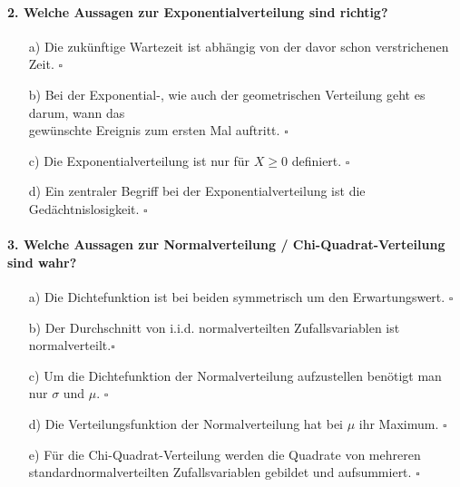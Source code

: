 \documentclass[a4paper]{article}
\begin{document}
\paragraph{2. Welche Aussagen zur Exponentialverteilung sind richtig?}
\begin{itemize}
    \item[a)] Die zukünftige Wartezeit ist abhängig von der davor schon verstrichenen Zeit. \hfill $\square$
    \item[b)] Bei der Exponential-, wie auch der geometrischen Verteilung geht es darum, wann das\\ gewünschte Ereignis zum ersten Mal auftritt. \hfill $\square$
    \item[c)] Die Exponentialverteilung ist nur für $X \geq 0$ definiert. \hfill $\square$
    \item[d)] Ein zentraler Begriff bei der Exponentialverteilung ist die Gedächtnislosigkeit. \hfill $\square$
\end{itemize}

\paragraph{3. Welche Aussagen zur Normalverteilung / Chi-Quadrat-Verteilung sind wahr?}
\begin{itemize}
    \item[a)] Die Dichtefunktion ist bei beiden symmetrisch um den Erwartungswert. \hfill $\square$
    \item[b)] Der Durchschnitt von i.i.d. normalverteilten Zufallsvariablen ist normalverteilt.\hfill $\square$ 
    \item[c)] Um die Dichtefunktion der Normalverteilung aufzustellen benötigt man nur $\sigma$ und $\mu$. \hfill $\square$
    \item[d)] Die Verteilungsfunktion der Normalverteilung hat bei $\mu$ ihr Maximum. \hfill $\square$
    \item[e)] Für die Chi-Quadrat-Verteilung werden die Quadrate von mehreren\\ standardnormalverteilten Zufallsvariablen gebildet und aufsummiert. \hfill $\square$
\end{itemize}
\end{document}

